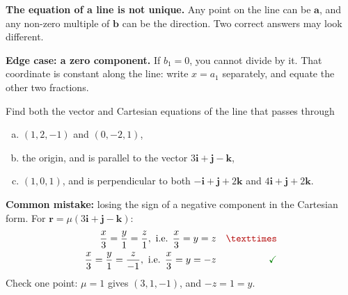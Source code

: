 \begin{caution}
\textbf{The equation of a line is not unique.} Any point on the line can be $\mathbf{a}$, and any non-zero multiple of $\mathbf{b}$ can be the direction. Two correct answers may look different.

\textbf{Edge case: a zero component.} If $b_1 = 0$, you cannot divide by it. That coordinate is constant along the line: write $x = a_1$ separately, and equate the other two fractions.
\end{caution}

\begin{example}[label=ex:4.1]
Find both the vector and Cartesian equations of the line that passes through
\begin{enumerate}[(a)]
  \item $(1,2,-1)$ and $(0,-2,1)$,
  \item the origin, and is parallel to the vector $3\mathbf{i} + \mathbf{j} - \mathbf{k}$,
  \item $(1,0,1)$, and is perpendicular to both $-\mathbf{i} + \mathbf{j} + 2\mathbf{k}$ and $4\mathbf{i} + \mathbf{j} + 2\mathbf{k}$.
\end{enumerate}
\end{example}

\begin{mistake}
\textbf{Common mistake:} losing the sign of a negative component in the Cartesian form. For $\mathbf{r} = \mu(3\mathbf{i}+\mathbf{j}-\mathbf{k})$:
\begin{align*}
\dfrac{x}{3} = \dfrac{y}{1} = \dfrac{z}{1}, \ \text{i.e. } \dfrac{x}{3} = y = z & & \wrong \\
\dfrac{x}{3} = \dfrac{y}{1} = \dfrac{z}{-1}, \ \text{i.e. } \dfrac{x}{3} = y = -z & & \cmark
\end{align*}
Check one point: $\mu = 1$ gives $(3,1,-1)$, and $-z = 1 = y$.
\end{mistake}

